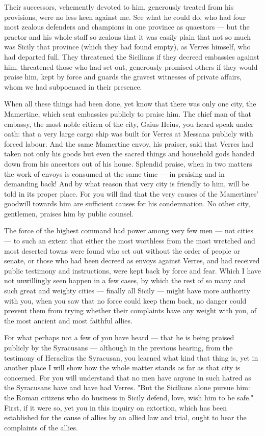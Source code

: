  Their successors, vehemently devoted to him, generously treated from his provisions, were no less keen against me. See what he could do, who had four most zealous defenders and champions in one province as quaestors --- but the praetor and his whole staff so zealous that it was easily plain that not so much was Sicily that province (which they had found empty), as Verres himself, who had departed full. They threatened the Sicilians if they decreed embassies against him, threatened those who had set out, generously promised others if they would praise him, kept by force and guards the gravest witnesses of private affairs, whom we had subpoenaed in their presence.

 When all these things had been done, yet know that there was only one city, the Mamertine, which sent embassies publicly to praise him. The chief man of that embassy, the most noble citizen of the city, Gaius Heius, you heard speak under oath: that a very large cargo ship was built for Verres at Messana publicly with forced labour. And the same Mamertine envoy, his praiser, said that Verres had taken not only his goods but even the sacred things and household gods handed down from his ancestors out of his house. Splendid praise, when in two matters the work of envoys is consumed at the same time --- in praising and in demanding back! And by what reason that very city is friendly to him, will be told in its proper place. For you will find that the very causes of the Mamertines' goodwill towards him are sufficient causes for his condemnation. No other city, gentlemen, praises him by public counsel.

 The force of the highest command had power among very few men --- not cities --- to such an extent that either the most worthless from the most wretched and most deserted towns were found who set out without the order of people or senate, or those who had been decreed as envoys against Verres, and had received public testimony and instructions, were kept back by force and fear. Which I have not unwillingly seen happen in a few cases, by which the rest of so many and such great and weighty cities --- finally all Sicily --- might have more authority with you, when you saw that no force could keep them back, no danger could prevent them from trying whether their complaints have any weight with you, of the most ancient and most faithful allies.

 For what perhaps not a few of you have heard --- that he is being praised publicly by the Syracusans --- although in the previous hearing, from the testimony of Heraclius the Syracusan, you learned what kind that thing is, yet in another place I will show how the whole matter stands as far as that city is concerned. For you will understand that no men have anyone in such hatred as the Syracusans have and have had Verres. "But the Sicilians alone pursue him: the Roman citizens who do business in Sicily defend, love, wish him to be safe." First, if it were so, yet you in this inquiry on extortion, which has been established for the cause of allies by an allied law and trial, ought to hear the complaints of the allies.

